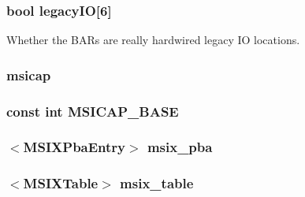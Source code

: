 \label{classPciDevice_a3c911166270cab77d55e5bc6626e8a05}
\hypertarget{classPciDevice_ae450137518092f3968ce3fc4ee94d98d}{
\subsubsection[{legacyIO}]{\setlength{\rightskip}{0pt plus 5cm}bool {\bf legacyIO}\mbox{[}6\mbox{]}}}
\label{classPciDevice_ae450137518092f3968ce3fc4ee94d98d}
Whether the BARs are really hardwired legacy IO locations. \hypertarget{classPciDevice_a0a9cdf296cde2e245b0c12d2bb193779}{
\subsubsection[{msicap}]{ {\bf msicap}}}
\label{classPciDevice_a0a9cdf296cde2e245b0c12d2bb193779}
\hypertarget{classPciDevice_ac80b4a250e5ead5d34f1808fcfadc1ef}{
\subsubsection[{MSICAP\_\-BASE}]{\setlength{\rightskip}{0pt plus 5cm}const int {\bf MSICAP\_\-BASE}}}
\label{classPciDevice_ac80b4a250e5ead5d34f1808fcfadc1ef}
\hypertarget{classPciDevice_ad51ec643d8bcd3569f6f888cda1459fe}{
\subsubsection[{msix\_\-pba}]{$<${\bf MSIXPbaEntry}$>$ {\bf msix\_\-pba}}}
\label{classPciDevice_ad51ec643d8bcd3569f6f888cda1459fe}
\hypertarget{classPciDevice_ab0606d92415296978b3baa5dda5b5ae1}{
\subsubsection[{msix\_\-table}]{$<${\bf MSIXTable}$>$ {\bf msix\_\-table}}}
